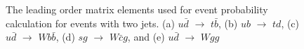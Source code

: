 \vspace{0.1in}
\begin{figure}[!h!tbp]
\begin{center}
\end{center}
\vspace{-0.1in}
\caption[2jets]{The leading order matrix elements used for event probability
calculation for events with two jets. (a) $u\bar{d}$ $\rightarrow$ $t\bar{b}$,
(b) $ub$ $\rightarrow$ $td$, (c) $u\bar{d}$ $\rightarrow$ $Wb\bar{b}$, (d) $sg$
$\rightarrow$ $W\bar{c}g$, and (e) $u\bar{d}$ $\rightarrow$ $Wgg$}
\label{2jets}
\end{figure}

